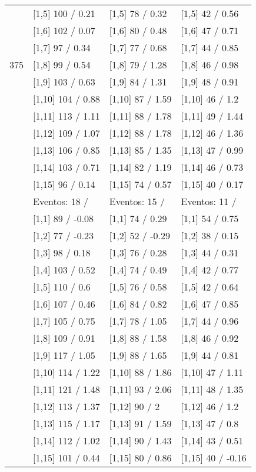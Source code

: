\begin{table}
\begin{tabular}[t]{llll}
 & {}[1,5] 100  / 0.21 & {}[1,5] 78  / 0.32 & {}[1,5] 42  / 0.56\\
 & {}[1,6] 102  / 0.07 & {}[1,6] 80  / 0.48 & {}[1,6] 47  / 0.71\\
 & {}[1,7] 97  / 0.34 & {}[1,7] 77  / 0.68 & {}[1,7] 44  / 0.85\\
375 & {}[1,8] 99  / 0.54 & {}[1,8] 79  / 1.28 & {}[1,8] 46  / 0.98\\
\addlinespace
 & {}[1,9] 103  / 0.63 & {}[1,9] 84  / 1.31 & {}[1,9] 48  / 0.91\\
 & {}[1,10] 104  / 0.88 & {}[1,10] 87  / 1.59 & {}[1,10] 46  / 1.2\\
 & {}[1,11] 113  / 1.11 & {}[1,11] 88  / 1.78 & {}[1,11] 49  / 1.44\\
 & {}[1,12] 109  / 1.07 & {}[1,12] 88  / 1.78 & {}[1,12] 46  / 1.36\\
 & {}[1,13] 106  / 0.85 & {}[1,13] 85  / 1.35 & {}[1,13] 47  / 0.99\\
\addlinespace
 & {}[1,14] 103  / 0.71 & {}[1,14] 82  / 1.19 & {}[1,14] 46  / 0.73\\
 & {}[1,15] 96  / 0.14 & {}[1,15] 74  / 0.57 & {}[1,15] 40  / 0.17\\
 & Eventos:  18 / & Eventos:  15 / & Eventos:  11 /\\
 & {}[1,1] 89  / -0.08 & {}[1,1] 74  / 0.29 & {}[1,1] 54  / 0.75\\
 & {}[1,2] 77  / -0.23 & {}[1,2] 52  / -0.29 & {}[1,2] 38  / 0.15\\
\addlinespace
 & {}[1,3] 98  / 0.18 & {}[1,3] 76  / 0.28 & {}[1,3] 44  / 0.31\\
 & {}[1,4] 103  / 0.52 & {}[1,4] 74  / 0.49 & {}[1,4] 42  / 0.77\\
 & {}[1,5] 110  / 0.6 & {}[1,5] 76  / 0.58 & {}[1,5] 42  / 0.64\\
 & {}[1,6] 107  / 0.46 & {}[1,6] 84  / 0.82 & {}[1,6] 47  / 0.85\\
 & {}[1,7] 105  / 0.75 & {}[1,7] 78  / 1.05 & {}[1,7] 44  / 0.96\\
\addlinespace
500 & {}[1,8] 109  / 0.91 & {}[1,8] 88  / 1.58 & {}[1,8] 46  / 0.92\\
 & {}[1,9] 117  / 1.05 & {}[1,9] 88  / 1.65 & {}[1,9] 44  / 0.81\\
 & {}[1,10] 114  / 1.22 & {}[1,10] 88  / 1.86 & {}[1,10] 47  / 1.11\\
 & {}[1,11] 121  / 1.48 & {}[1,11] 93  / 2.06 & {}[1,11] 48  / 1.35\\
 & {}[1,12] 113  / 1.37 & {}[1,12] 90  / 2 & {}[1,12] 46  / 1.2\\
\addlinespace
 & {}[1,13] 115  / 1.17 & {}[1,13] 91  / 1.59 & {}[1,13] 47  / 0.8\\
 & {}[1,14] 112  / 1.02 & {}[1,14] 90  / 1.43 & {}[1,14] 43  / 0.51\\
 & {}[1,15] 101  / 0.44 & {}[1,15] 80  / 0.86 & {}[1,15] 40  / -0.16\\
\bottomrule
\end{tabular}
\end{table}
